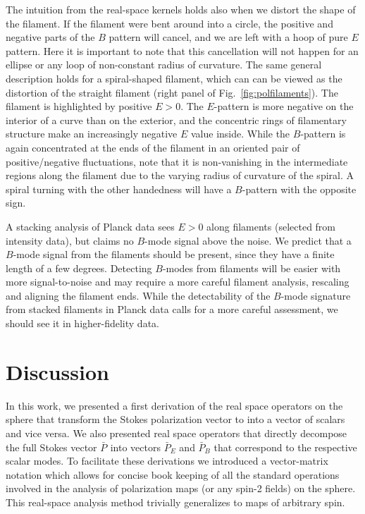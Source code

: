 \documentclass[a4paper,11pt]{article}
\def\vp#1{$\bar{P}_{#1}$ }
\def\fig#1{{Fig.~\ref{#1}}}
\begin{document}
The intuition from the real-space kernels holds also when we distort the shape of the filament.  If the filament were bent around into a circle, the positive and negative parts of the $B$ pattern will cancel, and we are left with a hoop of pure $E$ pattern. Here it is important to note that this cancellation will not happen for an ellipse or any loop of non-constant radius of curvature.
The same general description holds for a spiral-shaped filament, which can can be viewed as the distortion of the straight filament (right panel of  \fig{fig:polfilaments}).  The filament is highlighted by positive $E>0$.  The $E$-pattern is more negative on the interior of a curve than on the exterior, and the concentric rings of filamentary structure make an increasingly negative $E$ value inside. While the $B$-pattern is again concentrated at the ends of the filament in an oriented pair of positive/negative fluctuations, note that it is non-vanishing in the intermediate regions along the filament due to the varying radius of curvature of the spiral.  A spiral turning with the other handedness will have a $B$-pattern with the opposite sign.

A stacking analysis of Planck data \citep{2016A&A...586A.141P} sees $E>0$ along filaments (selected from intensity data), but claims no $B$-mode signal above the noise. We predict that a $B$-mode signal from the filaments should be present, since they have a finite length of a few degrees.  Detecting $B$-modes from filaments will be easier with more signal-to-noise and may require a more careful filament analysis, rescaling and aligning the filament ends.  While the detectability of the $B$-mode signature from stacked filaments in Planck data calls for a more careful assessment, we should see it in higher-fidelity data. 
%
\section{Discussion}\label{sec:discussion}
In this work, we presented a first derivation of the real space operators on the sphere that transform the Stokes polarization vector to into a vector of scalars and vice versa.  We also presented real space operators that directly decompose the full Stokes vector \vp{} into vectors \vp{E} and \vp{B} that correspond to the respective scalar modes.  To facilitate these derivations we introduced a vector-matrix notation which allows for concise book keeping of all the standard operations involved in the analysis of  polarization maps (or any spin-2 fields) on the sphere. This real-space analysis method trivially generalizes to maps of arbitrary spin.
\end{document}
